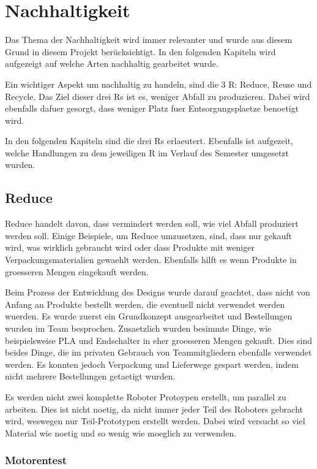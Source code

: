 \section{Nachhaltigkeit}
\label{section:Nachhaltigkeit}

Das Thema der Nachhaltigkeit wird immer relevanter und wurde aus diesem Grund in diesem Projekt berücksichtigt. In den folgenden Kapiteln wird aufgezeigt auf welche Arten nachhaltig gearbeitet wurde.

Ein wichtiger Aspekt um nachhaltig zu handeln, sind die 3 R: Reduce, Reuse und Recycle. Das Ziel dieser drei Rs ist es, weniger Abfall zu produzieren. Dabei wird ebenfalls dafuer gesorgt, dass weniger Platz fuer Entsorgungsplaetze benoetigt wird.\cite{3-r}

In den folgenden Kapiteln sind die drei Rs erlaeutert. Ebenfalls ist aufgezeit, welche Handlungen zu dem jeweiligen R im Verlauf des Semester umgesetzt wurden.

\subsection{Reduce}

Reduce handelt davon, dass vermindert werden soll, wie viel Abfall produziert werden soll. Einige Beispiele, um Reduce umzusetzen, sind, dass nur gekauft wird, was wirklich gebraucht wird oder dass Produkte mit weniger Verpackungsmaterialien gewaehlt werden. Ebenfalls hilft es wenn Produkte in groesseren Mengen eingekauft werden.

Beim Prozess der Entwicklung des Designs wurde darauf geachtet, dass nicht von Anfang an Produkte bestellt werden, die eventuell nicht verwendet werden wuerden. Es wurde zuerst ein Grundkonzept ausgearbeitet und Bestellungen wurden im Team besprochen. Zusaetzlich wurden besimmte Dinge, wie beispielsweise PLA und Endschalter in eher groesseren Mengen gekauft. Dies sind beides Dinge, die im privaten Gebrauch von Teammitgliedern ebenfalls verwendet werden. Es konnten jedoch Verpackung und Lieferwege gespart werden, indem nicht mehrere Bestellungen getaetigt wurden. 

Es werden nicht zwei komplette Roboter Protoypen erstellt, um parallel zu arbeiten. Dies ist nicht noetig, da nicht immer jeder Teil des Roboters gebracht wird, weswegen nur Teil-Prototypen erstellt werden. Dabei wird versucht so viel Material wie noetig und so wenig wie moeglich zu verwenden.

\subsubsection{Motorentest}

